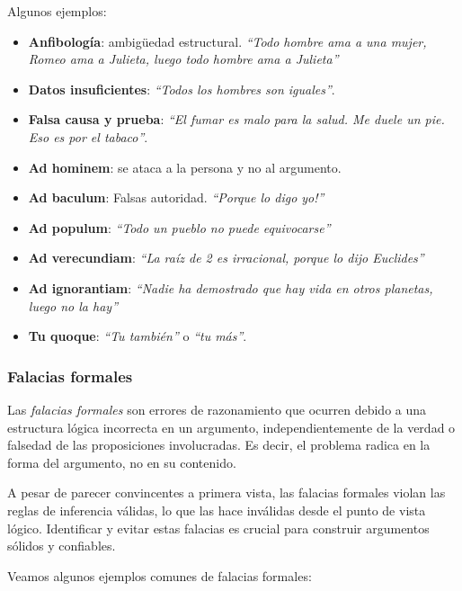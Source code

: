 Algunos ejemplos:
\begin{itemize}
	\item \textbf{Anfibología}: ambigüedad estructural. \textit{``Todo hombre ama a una mujer, Romeo ama a Julieta, luego todo hombre ama a Julieta''}
	\item \textbf{Datos insuficientes}: \textit{``Todos los hombres son iguales''}.
	\item \textbf{Falsa causa y prueba}: \textit{``El fumar es malo para la salud. Me duele un pie. Eso es por el tabaco''}.
	\item \textbf{Ad hominem}: se ataca a la persona y no al argumento.
	\item \textbf{Ad baculum}: Falsas autoridad. \textit{``Porque lo digo yo!''}
	\item \textbf{Ad populum}: \textit{``Todo un pueblo no puede equivocarse''}
	\item \textbf{Ad verecundiam}: \textit{``La raíz de 2 es irracional, porque lo dijo Euclides''}
	\item \textbf{Ad ignorantiam}: \textit{``Nadie ha demostrado que hay vida en otros planetas, luego no la hay''}
	\item \textbf{Tu quoque}: \textit{``Tu también''} o \textit{``tu más''}.
\end{itemize}

\subsubsection{Falacias formales}
\vspace{1em}
\begin{fmd-definition}
Las \textit{falacias formales} son errores de razonamiento que ocurren debido a una estructura lógica incorrecta en un argumento, independientemente de la verdad o falsedad de las proposiciones involucradas. Es decir, el problema radica en la forma del argumento, no en su contenido.
\end{fmd-definition}

A pesar de parecer convincentes a primera vista, las falacias formales violan las reglas de inferencia válidas, lo que las hace inválidas desde el punto de vista lógico. Identificar y evitar estas falacias es crucial para construir argumentos sólidos y confiables.

Veamos algunos ejemplos comunes de falacias formales:

